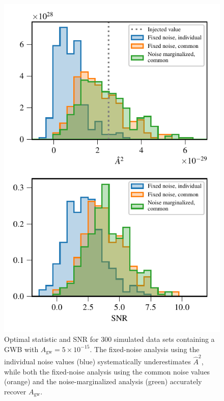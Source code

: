 \documentclass[twocolumn,aps,prd,superscriptaddress]{revtex4-1}
\newcommand{\Agw}{\ensuremath{A_\mathrm{gw}}}
\begin{document}
\begin{figure}[tb]
	\includegraphics[width=0.9\columnwidth]{plots/optstat_A5e-15.pdf}
	\caption{Optimal statistic and SNR for 300 simulated data sets 
			containing a GWB with $\Agw = 5\times10^{-15}$. 
			The fixed-noise analysis using the individual noise values (blue) 
			systematically underestimates $\hat{A}^2$, while both the 
			fixed-noise analysis using the common noise values (orange) 
			and the noise-marginalized analysis (green) 
			accurately recover $\Agw$.}
	\label{fig:os_datasetstats}
\end{figure}
\end{document}

